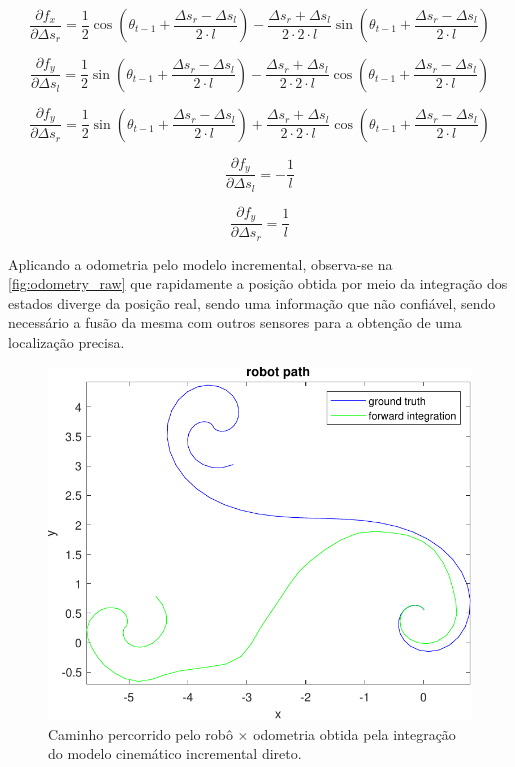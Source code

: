 \begin{equation}\label{eq:fxsr}
\dfrac{\partial f_x}{\partial \Delta s_r } =  
\dfrac{1}{2}\cos\left( \theta_{t-1} + \dfrac{\Delta s_r - \Delta s_l}{2\cdot l}\right)  - \dfrac{\Delta s_r + \Delta s_l}{2\cdot2 \cdot l}\sin\left( \theta_{t-1} + \dfrac{\Delta s_r - \Delta s_l}{2\cdot l}\right) 
\end{equation}

\begin{equation}\label{eq:fysl}
\dfrac{\partial f_y}{\partial \Delta s_l } =  
\dfrac{1}{2}\sin\left( \theta_{t-1} + \dfrac{\Delta s_r - \Delta s_l}{2\cdot l}\right)  - \dfrac{\Delta s_r + \Delta s_l}{2\cdot2 \cdot l}\cos\left( \theta_{t-1} + \dfrac{\Delta s_r - \Delta s_l}{2\cdot l}\right) 
\end{equation}

\begin{equation}\label{eq:fysr}
\dfrac{\partial f_y}{\partial \Delta s_r } =  
\dfrac{1}{2}\sin\left( \theta_{t-1} + \dfrac{\Delta s_r - \Delta s_l}{2\cdot l}\right)  + \dfrac{\Delta s_r + \Delta s_l}{2\cdot2 \cdot l}\cos\left( \theta_{t-1} + \dfrac{\Delta s_r - \Delta s_l}{2\cdot l}\right) 
\end{equation}

\begin{equation}\label{eq:fzsl}
\dfrac{\partial f_y}{\partial \Delta s_l } = -\dfrac{1}{l}
\end{equation}

\begin{equation}\label{eq:fzsr}
\dfrac{\partial f_y}{\partial \Delta s_r } = \dfrac{1}{l}
\end{equation}

Aplicando a odometria pelo modelo incremental, observa-se na \autoref{fig:odometry_raw} que rapidamente a posição obtida por meio da integração dos estados diverge da posição real, sendo uma informação que não confiável, sendo necessário a fusão da mesma com outros sensores para a obtenção de uma localização precisa.

\begin{figure}[H]
	\centering
	\includegraphics[width=0.75\linewidth]{img/odometry_raw}
	\caption{Caminho percorrido pelo robô $\times$ odometria obtida pela integração do  modelo cinemático incremental direto.}
	\label{fig:odometry_raw}
\end{figure}

